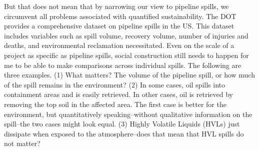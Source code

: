 \documentclass[12pt, man, natbib]{apa6}
\begin{document}
	But that does not mean that by narrowing our view to pipeline spills, we circumvent all problems associated with quantified sustainability. The DOT provides a comprehensive dataset on pipeline spills in the US. This dataset includes variables such as spill volume, recovery volume, number of injuries and deaths, and environmental reclamation necessitated. Even on the scale of a project as specific as pipeline spills, social construction still needs to happen for me to be able to make comparisons across individual spills. The following are three examples. (1) What matters? The volume of the pipeline spill, or how much of the spill remains in the environment? (2) In some cases, oil spills into containment areas and is easily retrieved. In other cases, oil is retrieved by removing the top soil in the affected area. The first case is better for the environment, but quantitatively speaking--without qualitative information on the spill--the two cases might look equal. (3) Highly Volatile Liquids (HVLs) just dissipate when exposed to the atmosphere--does that mean that HVL spills do not matter?


\end{document}

